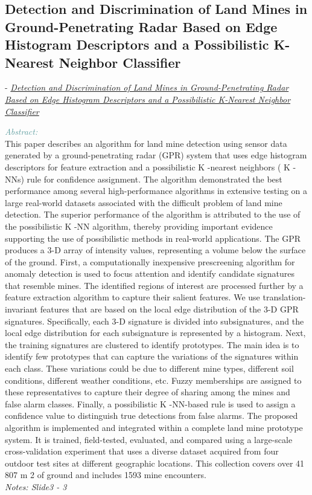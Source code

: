 \documentclass[]{article}
\newcommand{\paperentry}[4]{
            \hangindent=1cm
            \cite{#1} - \href{run:../References/#3}{\textcolor{Sepia}{\textit{#2}}}
            
            \noindent            
            \begin{minipage}[t]{0.1\linewidth}\hfill\end{minipage}
            \begin{minipage}[t]{0.8\linewidth}\textcolor{CadetBlue}{{\textit{Abstract:}}}\\#4\end{minipage}
            \vspace{.25cm}
          }
\begin{document}
 \subsection{Detection and Discrimination of Land Mines in Ground-Penetrating Radar Based on Edge Histogram Descriptors and a Possibilistic K-Nearest Neighbor Classifier} 			
 			\paperentry{Frigui2009ehd}
 			{Detection and Discrimination of Land Mines in Ground-Penetrating Radar Based on Edge Histogram Descriptors and a Possibilistic K-Nearest Neighbor Classifier}
 			{Existing Histogram Layers/ehd.pdf}
 			{This paper describes an algorithm for land mine detection using sensor data generated by a ground-penetrating radar (GPR) system that uses edge histogram descriptors for feature extraction and a possibilistic K -nearest neighbors ( K -NNs) rule for confidence assignment. The algorithm demonstrated the best performance among several high-performance algorithms in extensive testing on a large real-world datasets associated with the difficult problem of land mine detection. The superior performance of the algorithm is attributed to the use of the possibilistic K -NN algorithm, thereby providing important evidence supporting the use of possibilistic methods in real-world applications. The GPR produces a 3-D array of intensity values, representing a volume below the surface of the ground. First, a computationally inexpensive prescreening algorithm for anomaly detection is used to focus attention and identify candidate signatures that resemble mines. The identified regions of interest are processed further by a feature extraction algorithm to capture their salient features. We use translation-invariant features that are based on the local edge distribution of the 3-D GPR signatures. Specifically, each 3-D signature is divided into subsignatures, and the local edge distribution for each subsignature is represented by a histogram. Next, the training signatures are clustered to identify prototypes. The main idea is to identify few prototypes that can capture the variations of the signatures within each class. These variations could be due to different mine types, different soil conditions, different weather conditions, etc. Fuzzy memberships are assigned to these representatives to capture their degree of sharing among the mines and false alarm classes. Finally, a possibilistic K -NN-based rule is used to assign a confidence value to distinguish true detections from false alarms. The proposed algorithm is implemented and integrated within a complete land mine prototype system. It is trained, field-tested, evaluated, and compared using a large-scale cross-validation experiment that uses a diverse dataset acquired from four outdoor test sites at different geographic locations. This collection covers over 41 807 m 2 of ground and includes 1593 mine encounters.
 				\\\emph{Notes: Slide3 - 3}} \\ 
 			
\end{document}
